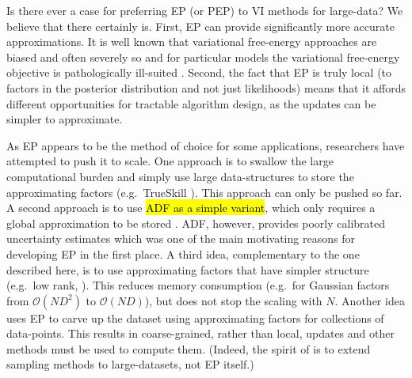Is there ever a case for preferring EP (or PEP) to VI methods for large-data?  We believe that there certainly is. First, EP can provide significantly more accurate approximations. It is well known that variational free-energy approaches are biased and often severely so \cite{turner+sahani:2011a} and for particular models the variational free-energy objective is pathologically ill-suited \cite{cunningham:gaussianEP,turner+sahani:2011c}. Second, the fact that EP is truly local (to factors in the posterior distribution and not just likelihoods) means that it affords different opportunities for tractable algorithm design, as the updates can be simpler to approximate.

As EP appears to be the method of choice for some applications, researchers have attempted to push it to scale. One approach is to swallow the large computational burden and simply use large data-structures to store the approximating factors (e.g.~TrueSkill \cite{herbrich:trueskill}). This approach can only be pushed so far. A second approach is to use \hl{ADF as a simple variant}, %
which only requires a global approximation to be stored \cite{maybeck:adf}. ADF, however, provides poorly calibrated uncertainty estimates \cite{minka:ep} which was one of the main motivating reasons for developing EP in the first place. 
A third idea, complementary to the one described here, is to use approximating factors that have simpler structure (e.g.~low rank, \cite{qi+minka:sparseGP}). This reduces memory consumption (e.g.~for Gaussian factors from $\mathcal{O}(ND^2)$ to $\mathcal{O}(ND)$), but does not stop the scaling with $N$. Another idea uses EP to carve up the dataset \cite{gelman:dep,xu:sms} using approximating factors for collections of data-points. This results in coarse-grained, rather than local, updates and other methods must be used to compute them. (Indeed, the spirit of \cite{gelman:dep,xu:sms} is to extend sampling methods to large-datasets, not EP itself.) 


